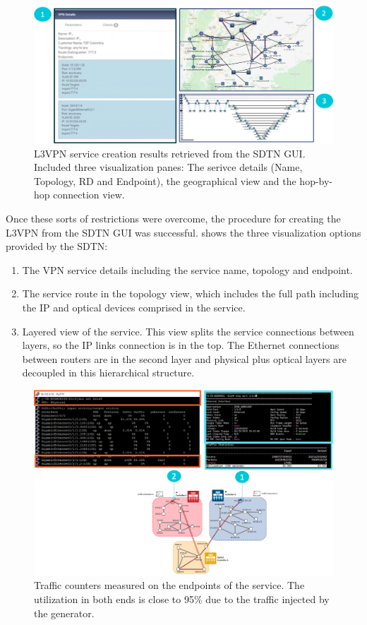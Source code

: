 \documentclass[a4paper,fleqn]{cas-dc}
\begin{document}
\begin{figure}
	\centering
		\includegraphics[width=\linewidth]{figs/l3vpn_results.png}
	\caption{L3VPN service creation results retrieved from the SDTN GUI. Included three visualization panes: The serivce details (Name, Topology, RD and Endpoint), the geographical view and the hop-by-hop connection view.}
	\label{FIG:l3vpn_results}
\end{figure}

Once these sorts of restrictions were overcome, the procedure for creating the L3VPN from the SDTN GUI was successful.  shows the three visualization options provided by the SDTN:
\begin{enumerate}
    \item The VPN service details including the service name, topology and endpoint.
    \item The service route in the topology view, which includes the full path including the IP and optical devices comprised in the service.
    \item Layered view of the service. This view splits the service connections between layers, so the IP links connection is in the top. The Ethernet connections between routers are in the second layer and physical plus optical layers are decoupled in this hierarchical structure.
\end{enumerate}

\begin{figure}
	\centering
		\includegraphics[width=\linewidth]{figs/counters.png}
	\caption{Traffic counters measured on the endpoints of the service. The utilization in both ends is close to 95\% due to the traffic injected by the generator.}
	\label{FIG:counters}
\end{figure}
\end{document}
